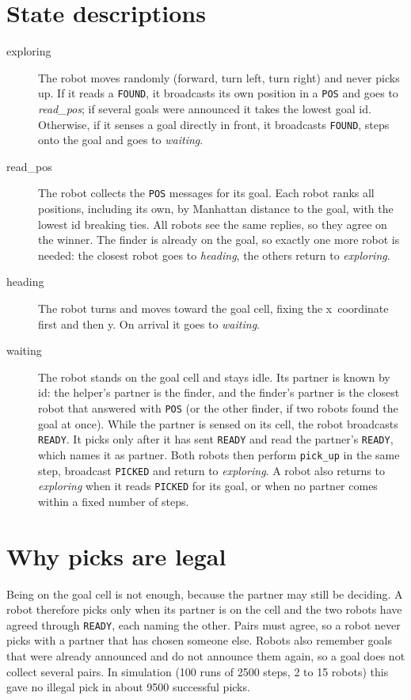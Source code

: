 \documentclass[11pt,a4paper]{article}
\begin{document}
\section{State descriptions}
\begin{description}
\item[exploring] The robot moves randomly (forward, turn left, turn right) and
never picks up. If it reads a \texttt{FOUND}, it broadcasts its own position in
a \texttt{POS} and goes to \emph{read\_pos}; if several goals were announced it
takes the lowest goal id. Otherwise, if it senses a goal directly in front, it
broadcasts \texttt{FOUND}, steps onto the goal and goes to \emph{waiting}.

\item[read\_pos] The robot collects the \texttt{POS} messages for its goal.
Each robot ranks all positions, including its own, by Manhattan distance to the
goal, with the lowest id breaking ties. All robots see the same replies, so they
agree on the winner. The finder is already on the goal, so exactly one more
robot is needed: the closest robot goes to \emph{heading}, the others return to
\emph{exploring}.

\item[heading] The robot turns and moves toward the goal cell, fixing the
x~coordinate first and then y. On arrival it goes to \emph{waiting}.

\item[waiting] The robot stands on the goal cell and stays idle. Its partner is
known by id: the helper's partner is the finder, and the finder's partner is the
closest robot that answered with \texttt{POS} (or the other finder, if two robots
found the goal at once). While the partner is sensed on its cell, the robot
broadcasts \texttt{READY}. It picks only after it has sent \texttt{READY} and
read the partner's \texttt{READY}, which names it as partner. Both robots then
perform \texttt{pick\_up} in the same step, broadcast \texttt{PICKED} and return
to \emph{exploring}. A robot also returns to \emph{exploring} when it reads
\texttt{PICKED} for its goal, or when no partner comes within a fixed number of
steps.
\end{description}

\section{Why picks are legal}
Being on the goal cell is not enough, because the partner may still be
deciding. A robot therefore picks only when its partner is on the cell and the
two robots have agreed through \texttt{READY}, each naming the other. Pairs must
agree, so a robot never picks with a partner that has chosen someone else.
Robots also remember goals that were already announced and do not announce them
again, so a goal does not collect several pairs. In simulation (100 runs of 2500
steps, 2 to 15 robots) this gave no illegal pick in about 9500 successful picks.
\end{document}
